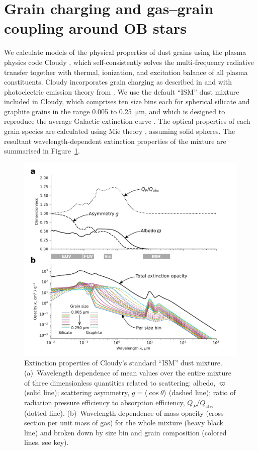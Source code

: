 
\section{Grain charging and gas--grain coupling around OB stars}
\label{sec:cloudy-models-dust}

We calculate models of the physical properties of dust grains using
the plasma physics code Cloudy \citep{Ferland:2013a, Ferland:2017a},
which self-consistently solves the multi-frequency radiative transfer
together with thermal, ionization, and excitation balance of all
plasma constituents.  Cloudy incorporates grain charging as described
in \citet{Baldwin:1991a} and \citet{van-Hoof:2004a} with photoelectric
emission theory from \citet{Weingartner:2001b, Weingartner:2006a}.  We
use the default ``ISM'' dust mixture included in Cloudy, which
comprises ten size bins each for spherical silicate and graphite
grains in the range \num{0.005} to \SI{0.25}{\um}, and which is
designed to reproduce the average Galactic extinction curve
\citep{Weingartner:2001a, Abel:2008a}.  The optical properties of each
grain species are calculated using Mie theory \citep{Bohren:1983a},
assuming solid spheres.  The resultant wavelength-dependent extinction
properties of the mixture are summarised in
Figure~\ref{fig:cloudy-ism-dust-opacity}.

\begin{figure}
  \centering
  \includegraphics[width=\linewidth]{figs/cloudy-ism-dust-opacity}
  \caption{Extinction properties of Cloudy's standard ``ISM'' dust
    mixture. %
    (a)~Wavelength dependence of mean values over the entire mixture
    of three dimensionless quantities related to scattering: albedo,
    \(\varpi\) (solid line); scattering asymmetry,
    \(g = \langle \cos\theta \rangle\) (dashed line); ratio of radiation pressure
    efficiency to absorption efficiency, \(Q_P / Q_{\text{abs}}\)
    (dotted line).
    (b)~Wavelength dependence of mass opacity (cross section per unit
    mass of gas) for the whole mixture (heavy black line) and broken
    down by size bin and grain composition (colored lines, see key). }
  \label{fig:cloudy-ism-dust-opacity}
\end{figure}


